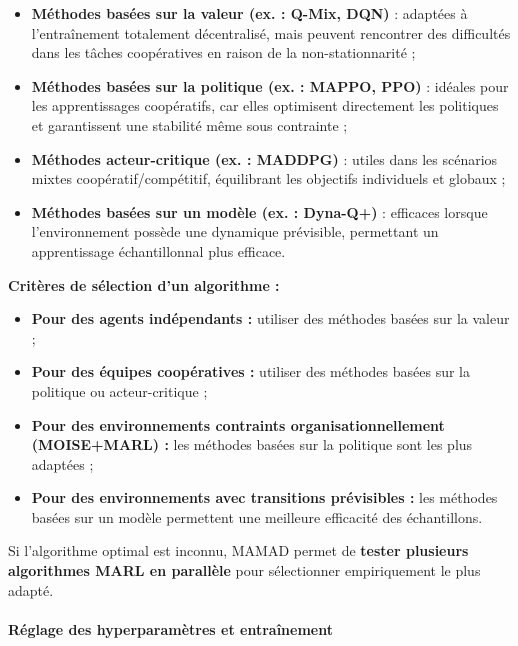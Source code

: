 \begin{itemize}
    \item \textbf{Méthodes basées sur la valeur (ex. : Q-Mix, DQN)} : adaptées à l'entraînement totalement décentralisé, mais peuvent rencontrer des difficultés dans les tâches coopératives en raison de la non-stationnarité ;
          
    \item \textbf{Méthodes basées sur la politique (ex. : MAPPO, PPO)} : idéales pour les apprentissages coopératifs, car elles optimisent directement les politiques et garantissent une stabilité même sous contrainte ;
          
    \item \textbf{Méthodes acteur-critique (ex. : MADDPG)} : utiles dans les scénarios mixtes coopératif/compétitif, équilibrant les objectifs individuels et globaux ;
          
    \item \textbf{Méthodes basées sur un modèle (ex. : Dyna-Q+)} : efficaces lorsque l'environnement possède une dynamique prévisible, permettant un apprentissage échantillonnal plus efficace.
\end{itemize}

\vspace{0.4em}
\noindent \textbf{Critères de sélection d'un algorithme :}
\begin{itemize}
    \item \textbf{Pour des agents indépendants :} utiliser des méthodes basées sur la valeur ;
    \item \textbf{Pour des équipes coopératives :} utiliser des méthodes basées sur la politique ou acteur-critique ;
    \item \textbf{Pour des environnements contraints organisationnellement (MOISE+MARL) :} les méthodes basées sur la politique sont les plus adaptées ;
    \item \textbf{Pour des environnements avec transitions prévisibles :} les méthodes basées sur un modèle permettent une meilleure efficacité des échantillons.
\end{itemize}

\vspace{0.4em}
\noindent Si l'algorithme optimal est inconnu, MAMAD permet de \textbf{tester plusieurs algorithmes MARL en parallèle} pour sélectionner empiriquement le plus adapté.

\paragraph{Réglage des hyperparamètres et entraînement}

